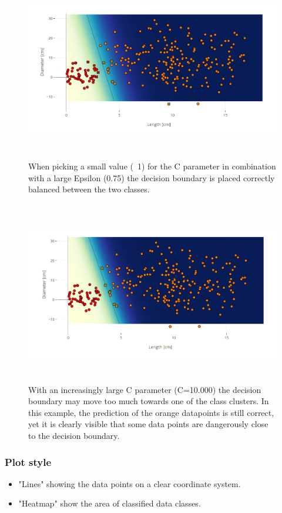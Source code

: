 \documentclass{scrartcl}
\begin{document}
\begin{figure}
	\centering
	\includegraphics[height=8cm]{SalmonLin75_1}
	\caption{When picking a small value (~1) for the C parameter in combination with a large Epsilon (0.75) the decision boundary is placed correctly balanced between the two classes.}
	\label{fig:example}%
\end{figure}

\begin{figure}
	\centering
	\includegraphics[height=8cm]{SalmonLin75_10k}
	\caption{With an increasingly large C parameter (C=10.000) the decision boundary may move too much towards one of the class clusters. In this example, the prediction of the orange datapoints is still correct, yet it is clearly visible that some data points are dangerously close to the decision boundary.}%
	\label{fig:example}%
\end{figure}


\subsubsection*{Plot style}
\begin{itemize}
	\item "Lines" showing the data points on a clear coordinate system.
	\item "Heatmap" show the area of classified data classes.
\end{itemize}
\end{document}

